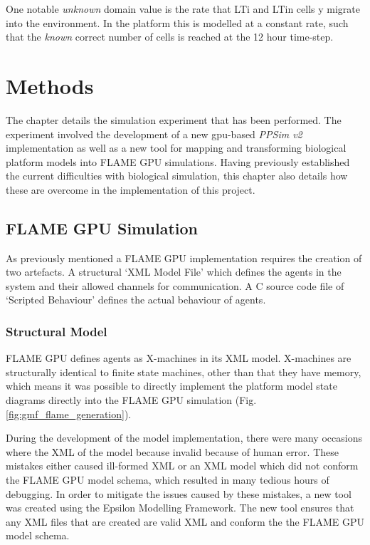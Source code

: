 \documentclass{UoYCSproject}
\begin{document}
One notable \textit{unknown} domain value is the rate that \gls{LTi} and \gls{LTin} cells y migrate into the environment.
In the \gls{platform} this is modelled at a constant rate, such that the \textit{known} correct number of cells is reached at the 12 hour time-step.

\chapter{Methods}
\label{methods}

The chapter details the simulation experiment that has been performed.
The experiment involved the development of a new \acrshort{gpu}-based \textit{PPSim v2} implementation as well as a new tool for mapping and transforming biological platform models into \gls{FLAME GPU} simulations.
Having previously established the current difficulties with biological simulation, this chapter also details how these are overcome in the implementation of this project.

\section{\gls{FLAME GPU} Simulation}
As previously mentioned a \gls{FLAME GPU} implementation requires the creation of two artefacts.
A structural `XML Model File' which defines the agents in the system and their allowed channels for communication.
A C source code file of `Scripted Behaviour' defines the actual behaviour of agents.

\subsection{Structural Model}
\gls{FLAME GPU} defines agents as X-machines in its XML model.
X-machines are structurally identical to finite state machines, other than that they have memory, which means it was possible to directly implement the platform model state diagrams directly into the \gls{FLAME GPU} simulation (Fig. \ref{fig:gmf_flame_generation}).

During the development of the model implementation, there were many occasions where the XML of the model because invalid because of human error.
These mistakes either caused ill-formed XML or an XML model which did not conform the \gls{FLAME GPU} model schema, which resulted in many tedious hours of debugging.
In order to mitigate the issues caused by these mistakes, a new tool was created using the Epsilon Modelling Framework.
The new tool ensures that any XML files that are created are valid XML and conform the the \gls{FLAME GPU} model schema.
\end{document}
